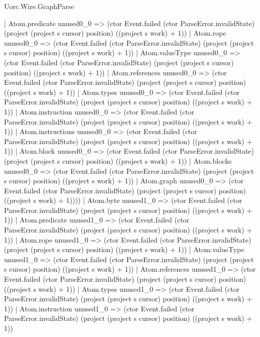 \begin{lexlean}{Uorc.Wire.GraphParse}
\begin{semanticmodule}
{              | Atom.predicate unused0_0 => (ctor Event.failed (ctor ParseError.invalidState) (project (project s cursor) position) ((project s work) + 1))
              | Atom.rope unused0_0 => (ctor Event.failed (ctor ParseError.invalidState) (project (project s cursor) position) ((project s work) + 1))
              | Atom.valueType unused0_0 => (ctor Event.failed (ctor ParseError.invalidState) (project (project s cursor) position) ((project s work) + 1))
              | Atom.references unused0_0 => (ctor Event.failed (ctor ParseError.invalidState) (project (project s cursor) position) ((project s work) + 1))
              | Atom.types unused0_0 => (ctor Event.failed (ctor ParseError.invalidState) (project (project s cursor) position) ((project s work) + 1))
              | Atom.instruction unused0_0 => (ctor Event.failed (ctor ParseError.invalidState) (project (project s cursor) position) ((project s work) + 1))
              | Atom.instructions unused0_0 => (ctor Event.failed (ctor ParseError.invalidState) (project (project s cursor) position) ((project s work) + 1))
              | Atom.block unused0_0 => (ctor Event.failed (ctor ParseError.invalidState) (project (project s cursor) position) ((project s work) + 1))
              | Atom.blocks unused0_0 => (ctor Event.failed (ctor ParseError.invalidState) (project (project s cursor) position) ((project s work) + 1))
              | Atom.graph unused0_0 => (ctor Event.failed (ctor ParseError.invalidState) (project (project s cursor) position) ((project s work) + 1))))
          | Atom.byte unused1_0 => (ctor Event.failed (ctor ParseError.invalidState) (project (project s cursor) position) ((project s work) + 1))
          | Atom.predicate unused1_0 => (ctor Event.failed (ctor ParseError.invalidState) (project (project s cursor) position) ((project s work) + 1))
          | Atom.rope unused1_0 => (ctor Event.failed (ctor ParseError.invalidState) (project (project s cursor) position) ((project s work) + 1))
          | Atom.valueType unused1_0 => (ctor Event.failed (ctor ParseError.invalidState) (project (project s cursor) position) ((project s work) + 1))
          | Atom.references unused1_0 => (ctor Event.failed (ctor ParseError.invalidState) (project (project s cursor) position) ((project s work) + 1))
          | Atom.types unused1_0 => (ctor Event.failed (ctor ParseError.invalidState) (project (project s cursor) position) ((project s work) + 1))
          | Atom.instruction unused1_0 => (ctor Event.failed (ctor ParseError.invalidState) (project (project s cursor) position) ((project s work) + 1))
}
\end{semanticmodule}
\end{lexlean}
